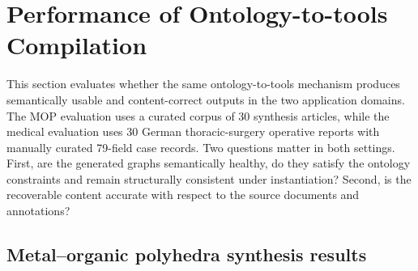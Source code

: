 \section{Performance of Ontology-to-tools Compilation}\label{sec:results}
  
This section evaluates whether the same ontology-to-tools mechanism produces semantically usable and content-correct outputs in the two application domains. The MOP evaluation uses a curated corpus of 30 synthesis articles, while the medical evaluation uses 30 German thoracic-surgery operative reports with manually curated 79-field case records. Two questions matter in both settings. First, are the generated graphs semantically healthy, \ie do they satisfy the ontology constraints and remain structurally consistent under instantiation? Second, is the recoverable content accurate with respect to the source documents and annotations?

\subsection{Metal--organic polyhedra synthesis results}

